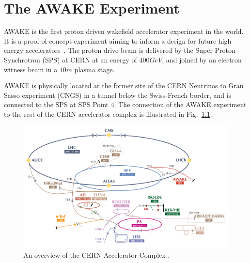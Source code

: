 %
%

\chapter{The AWAKE Experiment}
\label{Ch:WFA}

AWAKE is the first proton driven wakefield accelerator experiment in the world. It is a proof-of-concept experiment aiming to inform a design for future high energy accelerators~\cite{gschwendtner:2016}. The proton drive beam is delivered by the Super Proton Synchrotron (SPS) at CERN at an energy of $400\unit{GeV}$, and joined by an electron witness beam in a $10\unit{m}$ plasma stage.

AWAKE is physically located at the former site of the CERN Neutrinos to Gran Sasso experiment (CNGS) \cite{gschwendtner:2010} in a tunnel below the Swiss-French border, and is connected to the SPS at SPS Point 4. The connection of the AWAKE experiment to the rest of the CERN accelerator complex is illustrated in Fig.~\ref{Fig:WFA:AccComp}.

\begin{figure}[hbt]
    \centering
    \includegraphics[width=0.99\linewidth,trim={20mm 0mm 20mm 0mm},clip]{figures/AcceleratorComplex}
    \caption{\label{Fig:WFA:AccComp} An overview of the CERN Accelerator Complex \cite{add:mobs:2016}.}
\end{figure}


